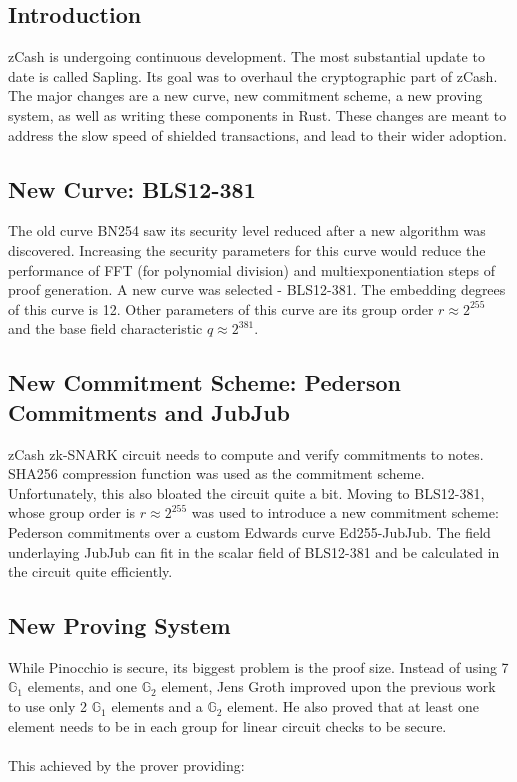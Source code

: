 \subsection{Introduction}
zCash is undergoing continuous development. The most substantial update to date is called Sapling. Its goal was to overhaul the cryptographic part of zCash. The major changes are a new curve, new commitment scheme, a new proving system, as well as writing these components in Rust. These changes are meant to address the slow speed of shielded transactions, and lead to their wider adoption.

\subsection{New Curve: BLS12-381}

The old curve BN254 saw its security level reduced after a new algorithm was discovered. Increasing the security parameters for this curve would reduce the performance of FFT (for polynomial division) and multiexponentiation steps of proof generation. A new curve was selected - BLS12-381. The embedding degrees of this curve is 12. Other parameters of this curve are its group order $r \approx 2^255$ and the base field characteristic $q \approx 2^381$.

\subsection{New Commitment Scheme: Pederson Commitments and JubJub}

zCash zk-SNARK circuit needs to compute and verify commitments to notes. SHA256 compression function was used as the commitment scheme. Unfortunately, this also bloated the circuit quite a bit. Moving to BLS12-381, whose group order is $r \approx 2^255$ was used to introduce a new commitment scheme: Pederson commitments over a custom Edwards curve Ed255-JubJub. The field underlaying JubJub can fit in the scalar field of BLS12-381 and be calculated in the circuit quite efficiently.

\subsection{New Proving System}

While Pinocchio is secure, its biggest problem is the proof size. Instead of using 7 $\mathbb{G}_1$ elements, and one $\mathbb{G}_2$ element, Jens Groth improved upon the previous work to use only 2 $\mathbb{G}_1$ elements and a $\mathbb{G}_2$ element. He also proved that at least one element needs to be in each group for linear circuit checks to be secure.\\
\\
This achieved by the prover providing:

